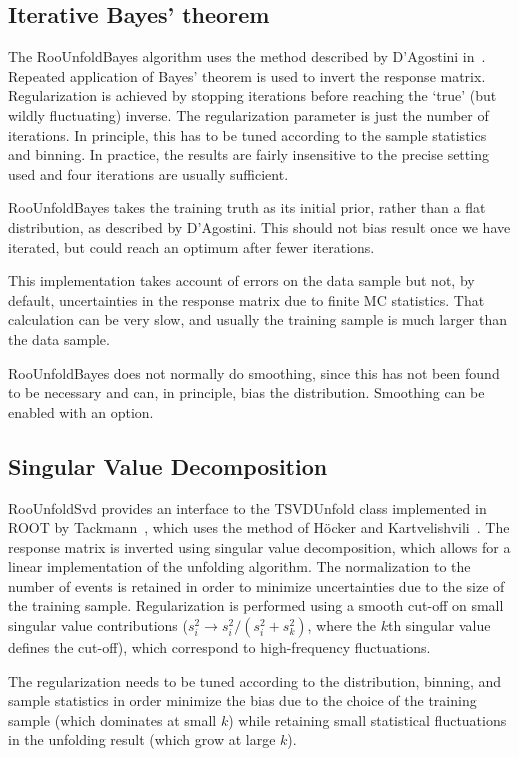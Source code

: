 \documentclass{cernrep}
\begin{document}
\subsection{Iterative Bayes' theorem}

The RooUnfoldBayes algorithm uses the method described by D'Agostini in~\cite{D'Agostini:1994zf}.
Repeated application of Bayes' theorem is used to invert the response matrix.
Regularization is achieved by stopping iterations before reaching the `true'
(but wildly fluctuating) inverse.
The regularization parameter is just the number of iterations.
In principle, this has to be tuned according to the sample statistics and binning.
In practice, the results are fairly insensitive to the precise setting used
and four iterations are usually sufficient.

RooUnfoldBayes takes the training truth as its initial prior, rather than a flat distribution,
as described by D'Agostini.
This should not bias result once we have iterated, but could reach an optimum after fewer iterations.

This implementation takes account of errors on the data sample but not,
by default, uncertainties in the response matrix due to finite MC statistics.
That calculation can be very slow, and usually the training sample is much larger
than the data sample.

RooUnfoldBayes does not normally do smoothing, since this has not been found to be necessary
and can, in principle, bias the distribution. Smoothing can be enabled with an option.

\subsection{Singular Value Decomposition}

RooUnfoldSvd provides an interface to the
TSVDUnfold class implemented in ROOT by Tackmann~\cite{Tackmann:PHYSTAT2011}, which
uses the method of H\"ocker and Kartvelishvili~\cite{Hocker:1995kb}.
The response matrix is inverted using singular value decomposition,
which allows for a linear implementation of the unfolding algorithm.
The normalization to the number of events is retained in order to minimize
uncertainties due to the size of the training sample.
Regularization is performed using a smooth cut-off on small singular value contributions
($s_i^2 \rightarrow s_i^2 / (s_i^2 + s_k^2)$, where the $k$th singular value defines the cut-off),
which correspond to high-frequency fluctuations.

The regularization needs to be tuned according to the distribution, binning, and sample statistics
in order minimize the bias due to the choice of the training sample (which dominates at small $k$)
while retaining small statistical fluctuations in the unfolding result (which grow at large $k$).
\end{document}
